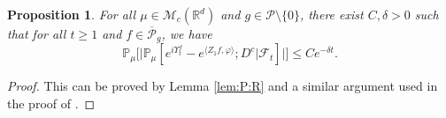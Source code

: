 \documentclass[12pt,a4paper]{amsart}
\theoremstyle{plain}
\newtheorem{prop}[thm]{Proposition}
\theoremstyle{definition}
\numberwithin{equation}{section}
\begin{document}
\begin{prop}
	\label{thm:Key}
	For all $\mu \in \mathcal M_c(\mathbb R^d)$ and $g \in \mathcal P \setminus \{0\}$, there exist $C,\delta>0$ such that
	for all $t\geq 1$ and $f \in \overline{\mathcal P}_g$, we have
	\[
	\mathbb P_\mu
	\Big[  \big|\mathbb P_\mu [e^{i\Upsilon^f_t} - e^{\langle Z_1f, \varphi\rangle}; D^c | \mathscr F_t ]  \big|\Big]
	\leq C e^{- \delta t}.
	\]
\end{prop}
\begin{proof}
	This can be proved by Lemma \ref{lem:P:R} and a similar argument used in the proof of \cite[Proposition 3.5]{RenSongSunZhao2019Stable}.
\end{proof}
\begin{comment}
\begin{proof}
	Fix  $\mu \in \mathcal M_c(\mathbb R^d)$ and $g \in \mathcal P\setminus \{0\}$.
	

\end{comment}
\end{document}
